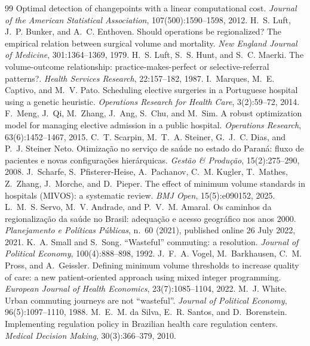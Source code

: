 \documentclass[11pt]{article}
\begin{document}
\begin{thebibliography}{99}
\newblock Optimal detection of changepoints with a linear computational cost.
\newblock \emph{Journal of the American Statistical Association}, 107(500):1590--1598, 2012.
H.~S. Luft, J.~P. Bunker, and A.~C. Enthoven.
\newblock Should operations be regionalized? The empirical relation between surgical volume and mortality.
\newblock \emph{New England Journal of Medicine}, 301:1364--1369, 1979.
H.~S. Luft, S.~S. Hunt, and S.~C. Maerki.
\newblock The volume-outcome relationship: practice-makes-perfect or selective-referral patterns?.
\newblock \emph{Health Services Research}, 22:157--182, 1987.
I.~Marques, M.~E. Captivo, and M.~V. Pato.
\newblock Scheduling elective surgeries in a Portuguese hospital using a genetic heuristic.
\newblock \emph{Operations Research for Health Care}, 3(2):59--72, 2014.
F.~Meng, J.~Qi, M.~Zhang, J.~Ang, S.~Chu, and M.~Sim.
\newblock A robust optimization model for managing elective admission in a public hospital.
\newblock \emph{Operations Research}, 63(6):1452--1467, 2015.
C.~T. Scarpin, M.~T.~A. Steiner, G.~J.~C. Dias, and P.~J. Steiner Neto.
\newblock Otimiza\c{c}\~ao no servi\c{c}o de sa\'ude no estado do Paran\'a: fluxo de pacientes e novas configura\c{c}\~oes hier\'arquicas.
\newblock \emph{Gest\~ao \& Produ\c{c}\~ao}, 15(2):275--290, 2008.
J.~Scharfe, S.~Pfisterer-Heise, A.~Pachanov, C.~M. Kugler, T.~Mathes, Z.~Zhang, J.~Morche, and D.~Pieper.
\newblock The effect of minimum volume standards in hospitals (MIVOS): a systematic review.
\newblock \emph{BMJ Open}, 15(5):e090152, 2025.
L.~M.~S. Servo, M.~V. Andrade, and P.~V.~M. Amaral.
\newblock Os caminhos da regionaliza\c{c}\~ao da sa\'ude no Brasil: adequa\c{c}\~ao e acesso geogr\'afico nos anos 2000.
\newblock \emph{Planejamento e Pol\'iticas P\'ublicas}, n.~60 (2021), published online 26 July 2022, 2021.
K.~A. Small and S.~Song.
\newblock ``Wasteful'' commuting: a resolution.
\newblock \emph{Journal of Political Economy}, 100(4):888--898, 1992.
J.~F.~A. Vogel, M.~Barkhausen, C.~M. Pross, and A.~Geissler.
\newblock Defining minimum volume thresholds to increase quality of care: a new patient-oriented approach using mixed integer programming.
\newblock \emph{European Journal of Health Economics}, 23(7):1085--1104, 2022.
M.~J. White.
\newblock Urban commuting journeys are not ``wasteful''.
\newblock \emph{Journal of Political Economy}, 96(5):1097--1110, 1988.
M.~E.~M. da Silva, E.~R. Santos, and D.~Borenstein.
\newblock Implementing regulation policy in Brazilian health care regulation centers.
\newblock \emph{Medical Decision Making}, 30(3):366--379, 2010.
\end{thebibliography}
\end{document}

